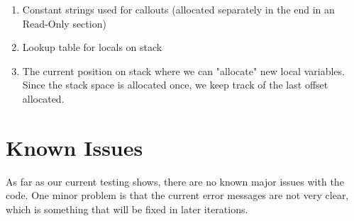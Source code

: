 \documentclass[11pt]{article}
\begin{document}
\begin{enumerate}
\item Constant strings used for callouts (allocated separately in the end in an Read-Only section)
\item Lookup table for locals on stack
\item The current position on stack where we can "allocate" new local variables. Since the stack space is allocated once, we keep track of the last offset allocated.
\end{enumerate}

\section{Known Issues}

\par As far as our current testing shows, there are no known major issues with the code. One minor problem is that the current error messages are not very clear, which is something that will be fixed in later iterations.
\end{document}

